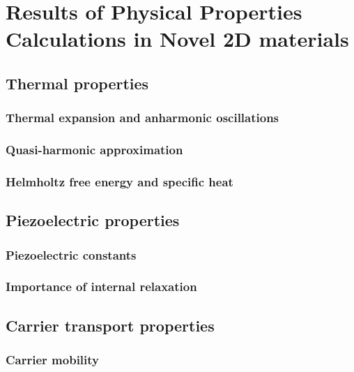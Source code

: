 
\chapter{Results of Physical Properties Calculations in Novel 2D materials}

\ifpdf
    \graphicspath{{Chapter4/Figs/Raster/}{Chapter4/Figs/PDF/}{Chapter4/Figs/}}
\else
    \graphicspath{{Chapter4/Figs/Vector/}{Chapter4/Figs/}}
\fi

\section{Thermal properties}
\subsection{Thermal expansion and anharmonic oscillations}
\subsection{Quasi-harmonic approximation}
\subsection{Helmholtz free energy and specific heat}

\section{Piezoelectric properties}
\subsection{Piezoelectric constants}
\subsection{Importance of internal relaxation}

\section{Carrier transport properties}
\subsection{Carrier mobility}
